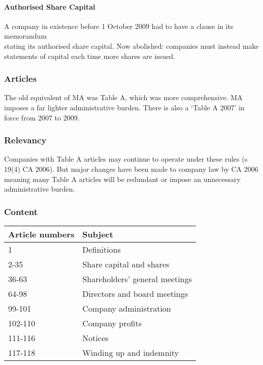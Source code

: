 \documentclass[
]{article}
\begin{document}
\hypertarget{authorised-share-capital}{%
\paragraph{Authorised Share Capital}\label{authorised-share-capital}}

A company in existence before 1 October 2009 had to have a clause in its
memorandum\\
stating its authorised share capital. Now abolished: companies must
instead make statements of capital each time more shares are issued.

\hypertarget{articles}{%
\subsubsection{Articles}\label{articles}}

The old equivalent of MA was Table A, which was more comprehensive. MA
imposes a far lighter administrative burden. There is also a `Table A
2007' in force from 2007 to 2009.

\hypertarget{relevancy}{%
\subsubsection{Relevancy}\label{relevancy}}

Companies with Table A articles may continue to operate under these
rules (s 19(4) CA 2006). But major changes have been made to company law
by CA 2006 meaning many Table A articles will be redundant or impose an
unnecessary administrative burden.

\hypertarget{content}{%
\subsubsection{Content}\label{content}}

\begin{longtable}[]{@{}ll@{}}
\toprule()
Article numbers & Subject \\
\midrule()
\endhead
1 & Definitions \\
2-35 & Share capital and shares \\
36-63 & Shareholders' general meetings \\
64-98 & Directors and board meetings \\
99-101 & Company administration \\
102-110 & Company profits \\
111-116 & Notices \\
117-118 & Winding up and indemnity \\
\bottomrule()
\end{longtable}
\end{document}
